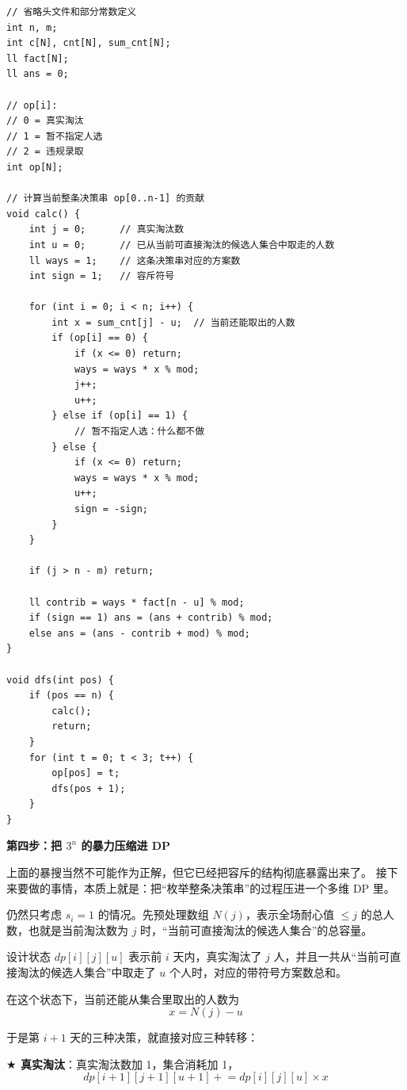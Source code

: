 \documentclass{book}
\newcommand{\DropTake}{\ensuremath{\bigstar}}
\begin{document}
\begin{lstlisting}[style = code]
// 省略头文件和部分常数定义
int n, m;
int c[N], cnt[N], sum_cnt[N];
ll fact[N];
ll ans = 0;

// op[i]:
// 0 = 真实淘汰
// 1 = 暂不指定人选
// 2 = 违规录取
int op[N];

// 计算当前整条决策串 op[0..n-1] 的贡献
void calc() {
    int j = 0;      // 真实淘汰数
    int u = 0;      // 已从当前可直接淘汰的候选人集合中取走的人数
    ll ways = 1;    // 这条决策串对应的方案数
    int sign = 1;   // 容斥符号

    for (int i = 0; i < n; i++) {
        int x = sum_cnt[j] - u;  // 当前还能取出的人数
        if (op[i] == 0) {
            if (x <= 0) return;
            ways = ways * x % mod;
            j++;
            u++;
        } else if (op[i] == 1) {
            // 暂不指定人选：什么都不做
        } else {
            if (x <= 0) return;
            ways = ways * x % mod;
            u++;
            sign = -sign;
        }
    }

    if (j > n - m) return;

    ll contrib = ways * fact[n - u] % mod;
    if (sign == 1) ans = (ans + contrib) % mod;
    else ans = (ans - contrib + mod) % mod;
}

void dfs(int pos) {
    if (pos == n) {
        calc();
        return;
    }
    for (int t = 0; t < 3; t++) {
        op[pos] = t;
        dfs(pos + 1);
    }
}
\end{lstlisting}

\par\medskip
\noindent\textbf{第四步：把 $3^n$ 的暴力压缩进 DP}
\par\medskip

上面的暴搜当然不可能作为正解，但它已经把容斥的结构彻底暴露出来了。  
接下来要做的事情，本质上就是：把“枚举整条决策串”的过程压进一个多维 DP 里。

仍然只考虑 $s_i=1$ 的情况。先预处理数组 $N(j)$，表示全场耐心值 $\le j$ 的总人数，也就是当前淘汰数为 $j$ 时，“当前可直接淘汰的候选人集合”的总容量。

设计状态 $dp[i][j][u]$ 表示前 $i$ 天内，真实淘汰了 $j$ 人，并且一共从“当前可直接淘汰的候选人集合”中取走了 $u$ 个人时，对应的带符号方案数总和。

在这个状态下，当前还能从集合里取出的人数为
\[
x = N(j) - u
\]

于是第 $i+1$ 天的三种决策，就直接对应三种转移：

\quad \textbf{$\DropTake$ 真实淘汰}：真实淘汰数加 1，集合消耗加 1，
\[
dp[i+1][j+1][u+1] \mathrel{+}= dp[i][j][u] \times x
\]
\end{document}
